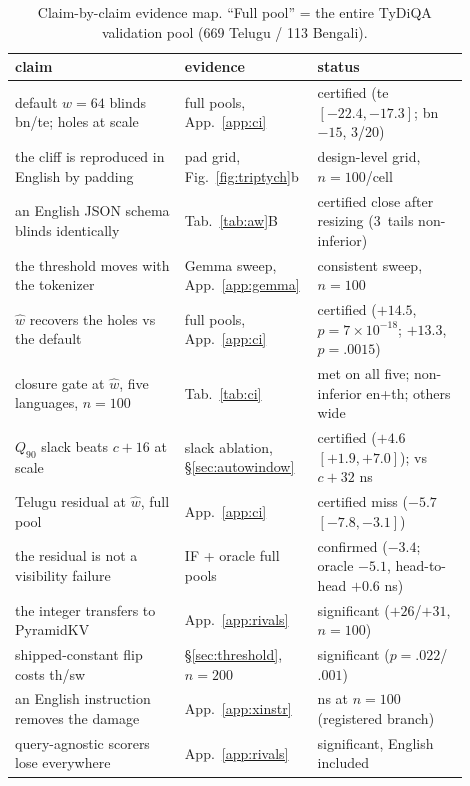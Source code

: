\documentclass{article}
\begin{document}
\begin{table}[h]
\caption{Claim-by-claim evidence map. ``Full pool'' = the entire
TyDiQA validation pool (669 Telugu / 113 Bengali).}
\label{tab:claims}
\centering
\small
\renewcommand{\arraystretch}{1.15}
\begin{tabular}{>{\raggedright\arraybackslash}p{0.36\linewidth}%
                >{\raggedright\arraybackslash}p{0.22\linewidth}%
                >{\raggedright\arraybackslash}p{0.32\linewidth}}
\toprule
claim & evidence & status \\
\midrule
default $w{=}64$ blinds bn/te; holes at scale & full pools, App.~\ref{app:ci} & certified (te $[-22.4,-17.3]$; bn $-15$, 3/20) \\
the cliff is reproduced in English by padding & pad grid, Fig.~\ref{fig:triptych}b & design-level grid, $n{=}100$/cell \\
an English JSON schema blinds identically & Tab.~\ref{tab:aw}B & certified close after resizing (3~tails non-inferior) \\
the threshold moves with the tokenizer & Gemma sweep, App.~\ref{app:gemma} & consistent sweep, $n{=}100$ \\
$\hat w$ recovers the holes vs the default & full pools, App.~\ref{app:ci} & certified ($+14.5$, \mbox{$p{=}7{\times}10^{-18}$}; $+13.3$, \mbox{$p{=}.0015$}) \\
closure gate at $\hat w$, five languages, $n{=}100$ & Tab.~\ref{tab:ci} & met on all five; non-inferior en+th; others wide \\
$Q_{90}$ slack beats $c{+}16$ at scale & slack ablation, \S\ref{sec:autowindow} & certified ($+4.6$~$[+1.9,+7.0]$); vs $c{+}32$ ns \\
Telugu residual at $\hat w$, full pool & App.~\ref{app:ci} & certified miss ($-5.7$~$[-7.8,-3.1]$) \\
the residual is not a visibility failure & IF + oracle full pools & confirmed ($-3.4$; oracle $-5.1$, head-to-head $+0.6$ ns) \\
the integer transfers to PyramidKV & App.~\ref{app:rivals} & significant ($+26$/$+31$, $n{=}100$) \\
shipped-constant flip costs th/sw & \S\ref{sec:threshold}, $n{=}200$ & significant ($p{=}.022$/$.001$) \\
an English instruction removes the damage & App.~\ref{app:xinstr} & ns at $n{=}100$ (registered branch) \\
query-agnostic scorers lose everywhere & App.~\ref{app:rivals} & significant, English included \\

\end{tabular}
\end{table}
\end{document}
